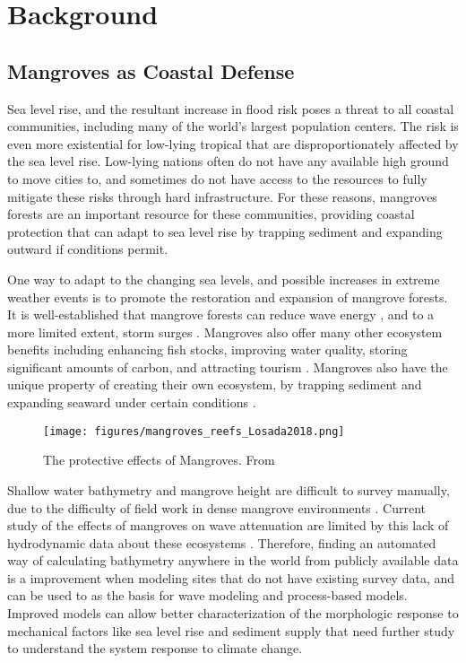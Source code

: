 
\chapter{Background}
\section{Mangroves as Coastal Defense}
Sea level rise, and the resultant increase in flood risk poses a threat to all coastal communities, including many of the world's largest population centers. The risk is even more existential for low-lying tropical that are disproportionately affected by the sea level rise. Low-lying nations often do not have any available high ground to move cities to, and sometimes do not have access to the resources to fully mitigate these risks through hard infrastructure. For these reasons, mangroves forests are an important resource for these communities, providing coastal protection that can adapt to sea level rise by trapping sediment and expanding outward if conditions permit.

One way to adapt to the changing sea levels, and possible increases in extreme weather events is to promote the restoration and expansion of mangrove forests. It is well-established that mangrove forests can reduce wave energy \parencite{Maza2019,Menendez2020,Hadi2003,Sanchez-Nunez2020}, and to a more limited extent, storm surges \parencite{Montgomery2019a,Chen2021,Mcivor2012}. Mangroves also offer many other ecosystem benefits including enhancing fish stocks, improving water quality, storing significant amounts of carbon, and attracting tourism \parencite{Atkinson2016b}. Mangroves also have the unique property of creating their own ecosystem, by trapping sediment and expanding seaward under certain conditions \cite{Gijsman2021}.

\begin{figure}[htbp]
      \centering
      \texttt{[image: figures/mangroves\_reefs\_Losada2018.png]}
      \caption{The protective effects of Mangroves. From \parencite{Losada2018}}
      \label{mangrove-protection-diagram}
\end{figure}

Shallow water bathymetry and mangrove height are difficult to survey manually, due to the difficulty of field work in dense mangrove environments \parencite{Gijsman2021}. Current study of the effects of mangroves on wave attenuation are limited by this lack of hydrodynamic data about these ecosystems \parencite{Horstman2014}.  Therefore, finding an automated way of calculating bathymetry anywhere in the world from publicly available data is a improvement when modeling sites that do not have existing survey data, and can be used to as the basis for wave modeling and process-based models. Improved models can allow better characterization of the morphologic response to mechanical factors like sea level rise and sediment supply that need further study to understand the system response to climate change.

